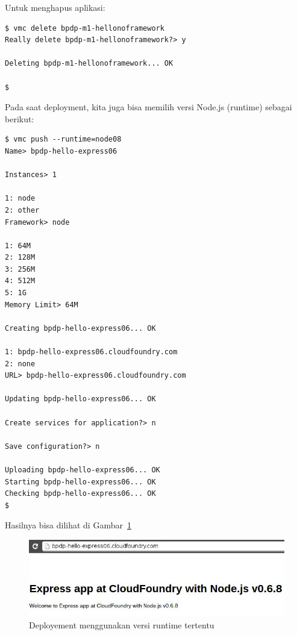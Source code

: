 Untuk menghapus aplikasi:

\lstset{language=bash,caption=Menghapus aplikasi yang di-deploy di CF}
\begin{lstlisting}
$ vmc delete bpdp-m1-hellonoframework
Really delete bpdp-m1-hellonoframework?> y

Deleting bpdp-m1-hellonoframework... OK

$ 
\end{lstlisting}

Pada saat deployment, kita juga bisa memilih versi Node.js (runtime) sebagai berikut:

\lstset{language=bash,caption=Deployment ke CF dengan memilih runtime Node.js}
\begin{lstlisting}
$ vmc push --runtime=node08 
Name> bpdp-hello-express06

Instances> 1

1: node
2: other
Framework> node

1: 64M
2: 128M
3: 256M
4: 512M
5: 1G
Memory Limit> 64M

Creating bpdp-hello-express06... OK

1: bpdp-hello-express06.cloudfoundry.com
2: none
URL> bpdp-hello-express06.cloudfoundry.com

Updating bpdp-hello-express06... OK

Create services for application?> n

Save configuration?> n

Uploading bpdp-hello-express06... OK
Starting bpdp-hello-express06... OK
Checking bpdp-hello-express06... OK
$
\end{lstlisting}

Hasilnya bisa dilihat di Gambar~\ref{fig:modul1-hello-ganti-runtime}

  \begin{figure}
    \begin{center}
      \includegraphics[scale=0.5]{images/bpdp-express-hello-update06.jpg}
    \end{center}
    \caption{Deployement menggunakan versi runtime tertentu}
    \label{fig:modul1-hello-ganti-runtime}
  \end{figure}

